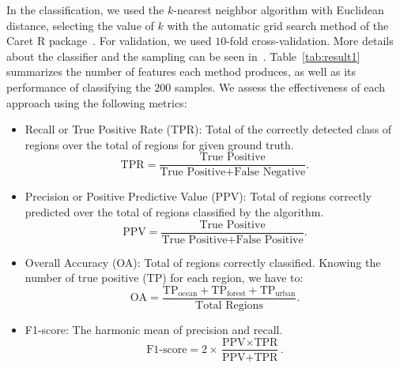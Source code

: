 \documentclass[journal]{IEEEtran}
\begin{document}
	In the classification, we used the $k$-nearest neighbor algorithm with Euclidean distance, selecting the value of $k$ with the automatic grid search method of the Caret R package~\cite{kuhn2008building}.
	For validation, we used $10$-fold cross-validation.
	More details about the classifier and the sampling can be seen in~\cite{mitchell1997machine}.
	Table~\ref{tab:result1} summarizes the number of features each method produces, as well as its performance of classifying the $200$ samples.
	We assess the effectiveness of each approach using the following metrics: 
	\begin{itemize}
		\item Recall or True Positive Rate (TPR): Total of the correctly detected class of regions over the total of regions for given ground truth.
		\begin{equation*}
		\text{TPR} = \frac{\text{True Positive}}{\text{True Positive} + \text{False Negative}}.
		\end{equation*}
		\item Precision or Positive Predictive Value (PPV): Total of regions correctly predicted over the total of regions classified by the algorithm.
		\begin{equation*}
		\text{PPV} = \frac{\text{True Positive}}{\text{True Positive} + \text{False Positive}}.
		\end{equation*}
		\item Overall Accuracy (OA): Total of regions correctly classified. 
		Knowing the number of true positive (TP) for each region, we have to:
		\begin{equation*}
		\text{OA} = \frac{\text{TP}_{\text{ocean}} + \text{TP}_{\text{forest}} + \text{TP}_{\text{urban}}}{\text{Total Regions}}.
		\end{equation*}
		\item F1-score: The harmonic mean of precision and recall.
		\begin{equation*}
		\text{F1-score} = 2 \times \frac{\text{PPV} \times \text{TPR}}{\text{PPV} + \text{TPR}}.
		\end{equation*}
	\end{itemize}
	
\end{document}
